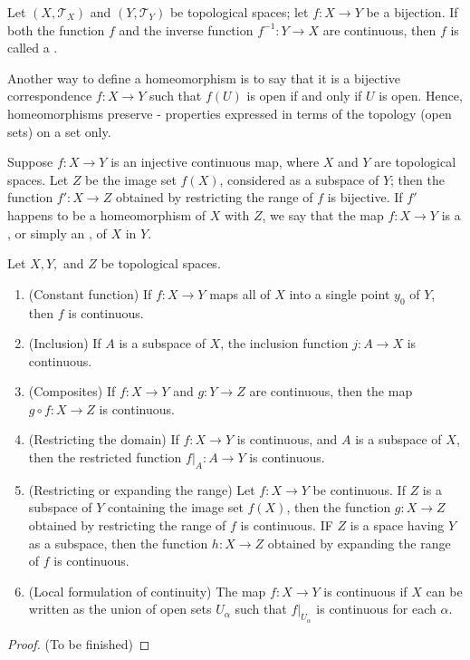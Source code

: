 \documentclass[12pt, a4paper, oneside, openright, titlepage]{book}
\begin{document}
\begin{defn}
    Let $(X,\mathcal{T}_X)$ and $(Y,\mathcal{T}_Y)$ be topological spaces; let $f:X\rightarrow Y$ be a bijection. If both the function $f$ and the inverse function $f^{-1}:Y\rightarrow X$ are continuous, then $f$ is called a .
\end{defn}

\begin{rmk}
    Another way to define a homeomorphism is to say that it is a bijective correspondence $f:X\rightarrow Y$ such that $f(U)$ is open if and only if $U$ is open. Hence, homeomorphisms preserve  - properties expressed in terms of the topology (open sets) on a set only.
\end{rmk}

\begin{defn}
    Suppose $f:X\rightarrow Y$ is an injective continuous map, where $X$ and $Y$ are topological spaces. Let $Z$ be the image set $f(X)$, considered as a subspace of $Y$; then the function $f':X\rightarrow Z$ obtained by restricting the range of $f$ is bijective. If $f'$ happens to be a homeomorphism of $X$ with $Z$, we say that the map $f:X\rightarrow Y$ is a , or simply an , of $X$ in $Y$.
\end{defn}



\begin{thm}
    Let $X,Y,$ and $Z$ be topological spaces. \begin{enumerate}
        \item (Constant function) If $f:X\rightarrow Y$ maps all of $X$ into a single point $y_0$ of $Y$, then $f$ is continuous.
        \item (Inclusion) If $A$ is a subspace of $X$, the inclusion function $j:A\rightarrow X$ is continuous.
        \item (Composites) If $f:X\rightarrow Y$ and $g:Y\rightarrow Z$ are continuous, then the map $g\circ f:X\rightarrow Z$ is continuous.
        \item (Restricting the domain) If $f:X\rightarrow Y$ is continuous, and $A$ is a subspace of $X$, then the restricted function $f\rvert_A:A\rightarrow Y$ is continuous. 
        \item (Restricting or expanding the range) Let $f:X\rightarrow Y$ be continuous. If $Z$ is a subspace of $Y$ containing the image set $f(X)$, then the function $g:X\rightarrow Z$ obtained by restricting the range of $f$ is continuous. IF $Z$ is a space having $Y$ as a subspace, then the function $h:X\rightarrow Z$ obtained by expanding the range of $f$ is continuous. 
        \item (Local formulation of continuity) The map $f:X\rightarrow Y$ is continuous if $X$ can be written as the union of open sets $U_{\alpha}$ such that $f\rvert_{U_{\alpha}}$ is continuous for each $\alpha$.
    \end{enumerate}
\end{thm}
\begin{proof}
    (To be finished)
\end{proof}
\end{document}
